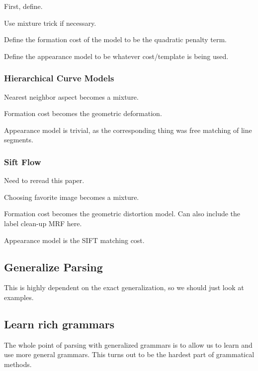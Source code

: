 \documentclass{article}
\begin{document}
First, define.

Use mixture trick if necessary.

Define the formation cost of the model to be the quadratic penalty term.

Define the appearance model to be whatever cost/template is being used.

\subsubsection{Hierarchical Curve Models}

Nearest neighbor aspect becomes a mixture.

Formation cost becomes the geometric deformation.

Appearance model is trivial, as the corresponding thing was free matching of line segments.

\subsubsection{Sift Flow}

Need to reread this paper.

Choosing favorite image becomes a mixture.

Formation cost becomes the geometric distortion model.
Can also include the label clean-up MRF here.

Appearance model is the SIFT matching cost.


\subsection{Generalize Parsing} 

This is highly dependent on the exact generalization, so we should
just look at examples.

\subsection{Learn rich grammars}

The whole point of parsing with generalized grammars is to allow us to
learn and use more general grammars. This turns out to be the hardest
part of grammatical methods.
\end{document}
